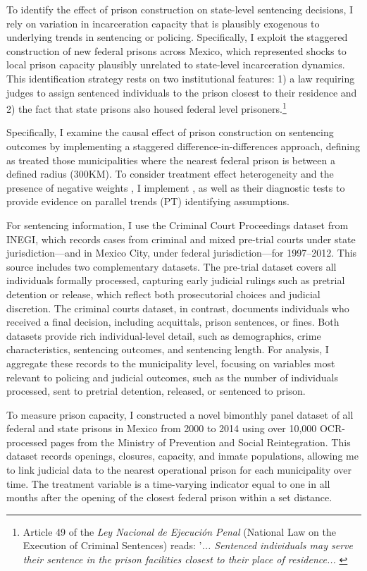 To identify the effect of prison construction on state-level sentencing decisions, I rely on variation in incarceration capacity that is plausibly exogenous to underlying trends in sentencing or policing. Specifically, I exploit the staggered construction of new federal prisons across Mexico, which represented shocks to local prison capacity plausibly unrelated to state-level incarceration dynamics. This identification strategy rests on two institutional features: 1) a law requiring judges to assign sentenced individuals to the prison closest to their residence and 2) the fact that state prisons also housed federal level prisoners.\footnote{Article 49 of the \textit{Ley Nacional de Ejecución Penal} (National Law on the Execution of Criminal Sentences) reads: '\textit{... Sentenced individuals may serve their sentence in the prison facilities closest to their place of residence...} \citep{LNEP2024}}

Specifically, I examine the causal effect of prison construction on sentencing outcomes by implementing a staggered difference-in-differences approach, defining as treated those municipalities where the nearest federal prison is between a defined radius (300KM). To consider treatment effect heterogeneity and the presence of negative weights \citep{Chaise-ReviewDID}, I implement \citep{Callaway}, as well as their diagnostic tests to provide evidence on parallel trends (PT) identifying assumptions.

For sentencing information, I use the Criminal Court Proceedings dataset from INEGI, which records cases from criminal and mixed pre-trial courts under state jurisdiction—and in Mexico City, under federal jurisdiction—for 1997–2012. This source includes two complementary datasets. The pre-trial dataset covers all individuals formally processed, capturing early judicial rulings such as pretrial detention or release, which reflect both prosecutorial choices and judicial discretion. The criminal courts dataset, in contrast, documents individuals who received a final decision, including acquittals, prison sentences, or fines. Both datasets provide rich individual-level detail, such as demographics, crime characteristics, sentencing outcomes, and sentencing length. For analysis, I aggregate these records to the municipality level, focusing on variables most relevant to policing and judicial outcomes, such as the number of individuals processed, sent to pretrial detention, released, or sentenced to prison.

To measure prison capacity, I constructed a novel bimonthly panel dataset of all federal and state prisons in Mexico from 2000 to 2014 using over 10,000 OCR-processed pages from the Ministry of Prevention and Social Reintegration. This dataset records openings, closures, capacity, and inmate populations, allowing me to link judicial data to the nearest operational prison for each municipality over time. The treatment variable is a time-varying indicator equal to one in all months after the opening of the closest federal prison within a set distance. 

